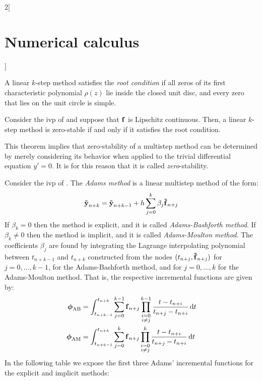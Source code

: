 \documentclass[../../../main_math.tex]{subfiles}
\begin{document}
\begin{multicols}{2}[\section{Numerical calculus}]
  \begin{definition}
    A linear $k$-step method satisfies the \emph{root condition} if all zeros of its first characteristic polynomial $\rho(z)$ lie inside the closed unit disc, and every zero that lies on the unit circle is simple.
  \end{definition}
  \begin{theorem}
    Consider the ivp of  and suppose that $\boldsymbol{\mathrm{f}}$ is Lipschitz continuous. Then, a linear $k$-step method is zero-stable if and only if it satisfies the root condition.
  \end{theorem}
  \begin{remark}
    This theorem implies that zero-stability of a multistep method can be determined by merely considering its behavior when applied to the trivial differential equation $y'=0$. It is for this reason that it is called \textit{zero}-stability.
  \end{remark}
  \begin{definition}
    Consider the ivp of . The \emph{Adams method} is a linear multistep method of the form:
    \begin{equation}\label{NC:Adams}
      \boldsymbol{\mathrm{\tilde{y}}}_{n+k}=\boldsymbol{\mathrm{\tilde{y}}}_{n+k-1}+h\sum_{j=0}^{k}\beta_j\boldsymbol{\mathrm{\tilde{f}}}_{n+j}
    \end{equation}
    If $\beta_{k}=0$ then the method is explicit, and it is called \emph{Adams-Bashforth method}. If $\beta_{k}\ne 0$ then the method is implicit, and it is called \emph{Adams-Moulton method}. The coefficients $\beta_j$ are found by integrating the Lagrange interpolating polynomial between $t_{n+k-1}$ and $t_{n+k}$ constructed from the nodes $(t_{n+j},\boldsymbol{\mathrm{\tilde{f}}}_{n+j})$ for $j=0,\ldots,k-1$, for the Adams-Bashforth method, and for $j=0,\ldots,k$ for the Adams-Moulton method. That is, the respective incremental functions are given by:
    \begin{align*}
      \boldsymbol{\mathrm{\phi}}_\mathrm{AB} & =\int_{t_{n+k-1}}^{t_{n+k}}\sum_{j=0}^{k-1}\boldsymbol{\mathrm{f}}_{n+j}\prod_{\substack{i=0 \\i\ne j}}^{k-1}\frac{t-t_{n+i}}{t_{n+j}-t_{n+i}}\dd{t}\\
      \boldsymbol{\mathrm{\phi}}_\mathrm{AM} & =\int_{t_{n+k-1}}^{t_{n+k}}\sum_{j=0}^{k}\boldsymbol{\mathrm{f}}_{n+j}\prod_{\substack{i=0   \\i\ne j}}^{k}\frac{t-t_{n+i}}{t_{n+j}-t_{n+i}}\dd{t}
    \end{align*}
    In the following table we expose the first three Adams' incremental functions for the explicit and implicit methods:

\end{definition}
\end{multicols}
\end{document}
